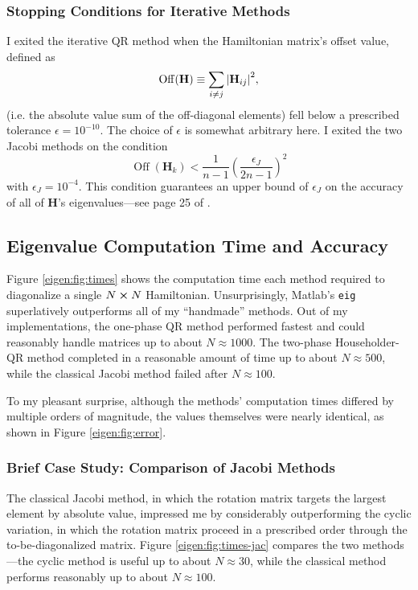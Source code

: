 \documentclass[11pt, a4paper]{article}
\newcommand{\mat}[1]{\mathbf{#1}}
\newcommand{\off}{\operatorname{Off}}
\begin{document}
\subsubsection{Stopping Conditions for Iterative Methods}
I exited the iterative QR method when the Hamiltonian matrix's offset value, defined as
\begin{equation*}
	\off(\mat{H}) \equiv \sum_{i\neq j}\abs{\mat{H}_{ij}}^{2},
\end{equation*}
(i.e. the absolute value sum of the off-diagonal elements) fell below a prescribed tolerance $ \epsilon = 10^{-10} $. The choice of $ \epsilon $ is somewhat arbitrary here. I exited the two Jacobi methods on the condition
\begin{equation*}
	\off(\mat{H}_{k}) < \frac{1}{n-1}\left(\frac{\epsilon_{J}}{2n-1}\right)^{2}
\end{equation*}
with $ \epsilon_{J} = 10^{-4} $. This condition guarantees an upper bound of $ \epsilon_{J} $ on the accuracy of all of $ \mat{H} $'s eigenvalues---see page 25 of \cite{chap3}.


\subsection{Eigenvalue Computation Time and Accuracy}
Figure \ref{eigen:fig:times} shows the computation time each method required to diagonalize a single $ N \cross N $ Hamiltonian. Unsurprisingly, Matlab's \texttt{eig} superlatively outperforms all of my ``handmade'' methods. Out of my implementations, the one-phase QR method performed fastest and could reasonably handle matrices up to about $ N \approx 1000 $. The two-phase Householder-QR method completed in a reasonable amount of time up to about $ N \approx 500 $, while the classical Jacobi method failed after $ N \approx 100 $. 

To my pleasant surprise, although the methods' computation times differed by multiple orders of magnitude, the values themselves were nearly identical, as shown in Figure \ref{eigen:fig:error}.

\subsubsection{Brief Case Study: Comparison of Jacobi Methods}
The classical Jacobi method, in which the rotation matrix targets the largest element by absolute value, impressed me by considerably outperforming the cyclic variation, in which the rotation matrix proceed in a prescribed order through the to-be-diagonalized matrix. Figure \ref{eigen:fig:times-jac} compares the two methods---the cyclic method is useful up to about $ N \approx 30 $, while the classical method performs reasonably up to about $ N \approx 100 $.
\end{document}
